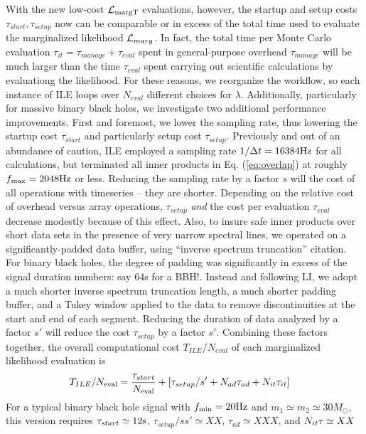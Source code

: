 \documentclass[twocolumn,prd,nofootinbib]{revtex4}
\newcommand\unit[1]{{\rm #1}}
\newcommand\ILE{ILE}
\newcommand\editremark[1]{{\color{red} #1}}
\begin{document}
With the new low-cost ${\cal L}_{\rm margT}$ evaluations, however, the startup and setup costs  $\tau_{start},\tau_{setup}$ now can be
comparable or in excess of the total time used to evaluate the marginalized likelihood ${\cal L}_{marg}$.   In fact, the total time per Monte Carlo
evaluation $\tau_{it}=\tau_{manage}+\tau_{eval}$  spent in general-purpose overhead $\tau_{manage}$ will be much larger than the time $\tau_{eval}$ spent
carrying out scientific calculations by evaluationg the likelihood.  For these reasons, we reorganize the workflow, so each
instance of ILE loops over
$N_{eval}$ different choices for $\lambda$. 
%
Additionally, particularly for massive binary black holes, we investigate two additional performance improvements.  First and
foremost, we lower the sampling rate, thus lowering the startup cost $\tau_{start}$ and particularly setup cost
$\tau_{setup}$.  Previously and out of an abundance of caution, \ILE{} employed a sampling rate $1/\Delta t = 16384
\unit{Hz}$ for all calculations, but terminated all inner products in Eq. (\ref{eq:overlap}) at roughly $f_{\rm
  max}=2048\unit{Hz}$ or less.   Reducing the sampling rate by a factor $s$ will the  cost of all operations with
timeseries -- they are shorter.  Depending on the relative cost of overhead versus array operations,  $\tau_{setup}$
\emph{and} the cost per evaluation $\tau_{eval}$ decrease modestly because of this effect.  
Also, to insure safe inner products over short data sets in the presence of very narrow spectral lines, we operated on a
significantly-padded data buffer,
using 
``inverse spectrum truncation'' \editremark{citation}.  For binary black holes, the degree of padding was significantly
in excess of the signal duration \editremark{numbers: say 64s for a BBH!}.  
Instead and following LI, we adopt a much shorter inverse spectrum truncation length, a much shorter padding buffer, and
a Tukey window applied to the data to remove discontinuities at the start and end of each segment.   
Reducing the duration of data analyzed by a factor $s'$ will reduce the cost $\tau_{setup}$ by a factor $s'$.  
%
Combining these factors together, the overall computational cost  $T_{ILE}/N_{eval}$  of each marginalized likelihood
evaluation is
\begin{align}
T_{ILE}/N_{\rm eval} &= \frac{\tau_{start}}{N_{\rm eval}} 
 + 
 [ \tau_{setup}/s' + N_{ad} \tau_{ad} + N_{it}\tau_{it}
 ] 
\end{align}
For a typical binary black hole signal with $f_{\rm min}=20 \unit{Hz}$ and $m_1\simeq m_2\simeq 30 M_\odot$, this
version requires $\tau_{start} \simeq 12\unit{s}$, $\tau_{setup}/ss' \simeq XX$, $\tau_{ad}\simeq XXX$, and $N_{it}\tau_{\it} \simeq XX$
\end{document}
